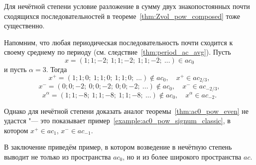 Для нечётной степени условие разложение в сумму двух знакопостоянных почти сходящихся последовательностей в теореме~\ref{thm:Zvol_pow_composed} тоже существенно.

\begin{example}
	Напомним,
	что любая периодическая последовательность почти сходится к своему среднему по периоду
	(см. следствие~\ref{thm:period_ac_avg}).
	Пусть
	\begin{equation}
		x = (1;1;-2;\ 1;1;-2;\ 1;1;-2;\ ...) \in ac_0
	\end{equation}
	и пусть $\alpha = 3$.
	Тогда
	\begin{equation}
		x^+ = (1;1;0;\ 1;1;0;\ 1;1;0;\ ...) \notin ac_0, \quad x^+ \in ac_{2/3}
		,
	\end{equation}
	\begin{equation}
		x^- = (0;0;-2;\ 0;0;-2;\ 0;0;-2;\ ...) \notin ac_0, \quad x^- \in ac_{-2/3}
		,
	\end{equation}
	\begin{equation}
		x^\alpha = (1;1;-8;\ 1;1;-8;\ 1;1;-8;\ ...) \notin ac_0, \quad x^\alpha \in ac_{-2}
		.
	\end{equation}
\end{example}

Однако для нечётной степени доказать аналог теоремы~\ref{thm:ac0_pow_even} не удастся "--- это показывает пример~\ref{example:ac0_pow_signum_classic}, в котором $x^+\in ac_1$, $x^-\in ac_{-1}$.

В заключение приведём пример, в котором возведение в нечётную степень выводит не только из пространства $ac_0$,
но и из более широкого пространства $ac$.

